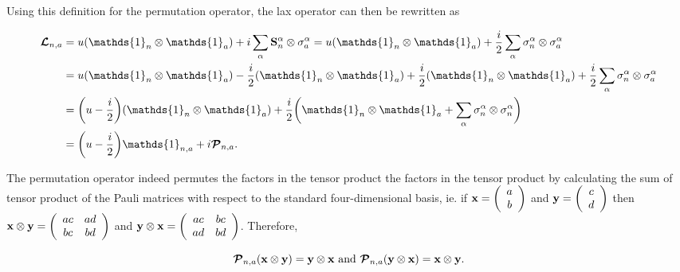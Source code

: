 \documentclass{homework}
\begin{document}
Using this definition for the permutation operator, the lax operator can then be rewritten as

\begin{equation}
    \begin{split}
       \bm{\mathcal{L}}_{n, a} &= u(\mathds{1}_n \otimes \mathds{1}_a) + i \sum_{\alpha} \spin_n^\alpha \otimes \sigma_{a}^\alpha = u(\mathds{1}_n \otimes \mathds{1}_a) + \frac{i}{2} \sum_{\alpha} \sigma_n^\alpha \otimes \sigma_{a}^\alpha \\
       &= u(\mathds{1}_n \otimes \mathds{1}_a) - \frac{i}{2} (\mathds{1}_n \otimes \mathds{1}_a) + \frac{i}{2} (\mathds{1}_n \otimes \mathds{1}_a) + \frac{i}{2} \sum_{\alpha} \sigma_n^\alpha \otimes \sigma_{a}^\alpha \\
       &= \bigg(u-\frac{i}{2}\bigg) (\mathds{1}_n \otimes \mathds{1}_a) + \frac{i}{2} \bigg( \mathds{1}_n \otimes \mathds{1}_a + \sum_{\alpha}\sigma_n^{\alpha}  \otimes \sigma_n^{\alpha} \bigg) \\
       &= \bigg(u-\frac{i}{2}\bigg) \mathds{1}_{n, a} + i \bm{\mathcal{P}}_{n, a}.
       \end{split}
       \label{l-matrix def}
\end{equation}

The permutation operator indeed permutes the factors in the tensor product the factors in the tensor product by calculating the sum of tensor product of the Pauli matrices with respect to the standard four-dimensional basis, ie. if ${\bf x} = \left(\begin{array}{c}
     a \\
     b 
\end{array}\right)$ and ${\bf y} = \left(\begin{array}{c}
     c \\
     d 
\end{array}\right)$ then ${\bf x} \otimes {\bf y} = \left( \begin{array}{cc}
    ac & ad  \\
    bc & bd 
\end{array} \right)$ and  ${\bf y} \otimes {\bf x} = \left( \begin{array}{cc}
    ac & bc  \\
    ad & bd 
\end{array} \right)$. Therefore,

\begin{equation}
    \bm{\mathcal{P}}_{n, a} ({\bf x} \otimes {\bf y} ) = {\bf y} \otimes {\bf x} \textnormal{ and } \bm{\mathcal{P}}_{n, a} ( {\bf y} \otimes {\bf x}) = {\bf x} \otimes {\bf y}.
\end{equation}
\end{document}
